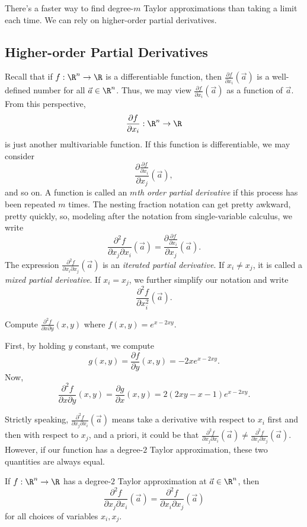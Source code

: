 There's a faster way to find degree-$m$ Taylor approximations
than taking a limit each time.  We can rely on higher-order 
partial derivatives.

\subsection{Higher-order Partial Derivatives}
Recall that if $f:\R^n\to\R$ is a differentiable function, then
$
	\frac{\partial f}{\partial x_i}(\vec a)
$
is a well-defined number for all $\vec a\in\R^n$.  
Thus, we may view $\frac{\partial f}{\partial x_i}(\vec a)$ as
a function of $\vec a$.  From this perspective, 
\[
	\frac{\partial f}{\partial x_i}:\R^n\to\R
\]
is just another multivariable function.  If this function is differentiable, we may consider
\[
	\frac{\partial \frac{\partial f}{\partial x_i}}{\partial x_j}(\vec a),
\]
and so on.  A function is called an \emph{$m$th order partial derivative}
if this process has been repeated $m$ times.
The nesting fraction notation can get pretty awkward, pretty quickly, so, modeling after
the notation from single-variable calculus, we write
\[
	\frac{\partial^2 f}{\partial x_j\partial x_i}(\vec a)=\frac{\partial \frac{\partial f}{\partial x_i}}{\partial x_j}(\vec a).
\]
The expression $\frac{\partial^2 f}{\partial x_i\partial x_j}(\vec a)$ is
an \emph{iterated partial derivative}.  If $x_i\neq x_j$, it is called
a \emph{mixed partial derivative}.  If
$x_i=x_j$, we further simplify our notation and write
\[
	\frac{\partial^2 f}{\partial x_i^2}(\vec a).
\]

\begin{example}
	Compute $\frac{\partial^2 f}{\partial x\partial y}(x,y)$ where $f(x,y)=e^{x-2xy}$.

	First, by holding $y$ constant, we compute
	\[
		g(x,y) = \frac{\partial f}{\partial y}(x,y) = -2xe^{x-2xy}.
	\]
	Now,
	\[
		\frac{\partial^2 f}{\partial x\partial y}(x,y)
		= \frac{\partial g}{\partial x}(x,y) = 2(2xy-x-1)e^{x-2xy}.
	\]
\end{example}

Strictly speaking, $\frac{\partial^2 f}{\partial x_j\partial x_i}(\vec a)$ means take a derivative
with respect to $x_i$ first and then with respect to $x_j$, and a priori, it could be that
$\frac{\partial^2 f}{\partial x_j\partial x_i}(\vec a)\neq \frac{\partial^2 f}{\partial x_i\partial x_j}(\vec a)$.
However, if our function has a degree-$2$ Taylor approximation, these two quantities are
always equal.
\begin{theorem}
	If $f:\R^n\to\R$ has a degree-$2$ Taylor approximation at $\vec a\in\R^n$, then
	\[
\frac{\partial^2 f}{\partial x_j\partial x_i}(\vec a)= \frac{\partial^2 f}{\partial x_i\partial x_j}(\vec a)
	\]
	for all choices of variables $x_i,x_j$.
\end{theorem}

